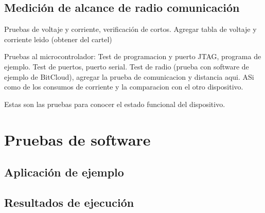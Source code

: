 
\subsection{Medici\'on de alcance de radio comunicaci\'on}



Pruebas de voltaje y corriente, verificaci\'on de cortos. 
Agregar tabla de voltaje y corriente leido (obtener del cartel)

Pruebas al microcontrolador: Test de programacion y puerto JTAG, programa de ejemplo. Test de puertos, puerto serial. 
Test de radio (prueba con software de ejemplo de BitCloud), agregar la prueba de comunicacion y distancia aqui. ASi como de los consumos de corriente y la comparacion con el otro dispositivo. 

Estas son las pruebas para conocer el estado funcional del dispositivo. 

\section{Pruebas de software}

\subsection{Aplicaci\'on de ejemplo}

\subsection{Resultados de ejecuci\'on}

